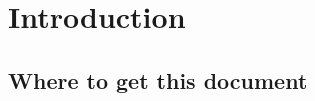 \documentclass[12pt,twoside,openright,a4paper]{book}
\begin{document}
\setcounter{page}{0}
\pagestyle{clean}


\setcounter{tocdepth}{1}
\dominitoc \tableofcontents

\noptcrule
\nomtcrule									%
\renewcommand{\mtcoffset}{-1.5em}			%
\def\mtcSfont{\normalsize}
\def\mtcSSfont{\small}



\mainmatter


\chapter{Introduction}


\minitoc


\section{Where to get this document}
\end{document}
